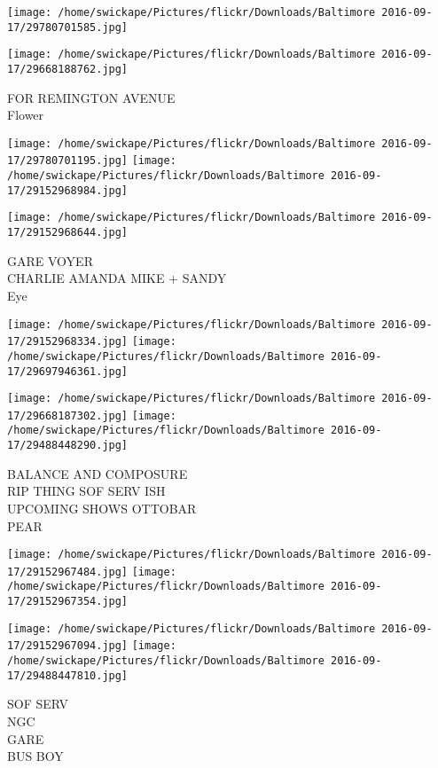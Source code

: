 \documentclass[10pt,letterpaper]{article}
\begin{document}
\texttt{[image: /home/swickape/Pictures/flickr/Downloads/Baltimore 2016-09-17/29780701585.jpg]}

\vspace{0.25in}
\texttt{[image: /home/swickape/Pictures/flickr/Downloads/Baltimore 2016-09-17/29668188762.jpg]}

FOR REMINGTON AVENUE\\
Flower\\
\pagebreak

\texttt{[image: /home/swickape/Pictures/flickr/Downloads/Baltimore 2016-09-17/29780701195.jpg]}
\texttt{[image: /home/swickape/Pictures/flickr/Downloads/Baltimore 2016-09-17/29152968984.jpg]}

\vspace{0.25in}
\texttt{[image: /home/swickape/Pictures/flickr/Downloads/Baltimore 2016-09-17/29152968644.jpg]}

GARE VOYER\\
CHARLIE AMANDA MIKE + SANDY\\
Eye\\
\pagebreak

\texttt{[image: /home/swickape/Pictures/flickr/Downloads/Baltimore 2016-09-17/29152968334.jpg]}
\texttt{[image: /home/swickape/Pictures/flickr/Downloads/Baltimore 2016-09-17/29697946361.jpg]}

\texttt{[image: /home/swickape/Pictures/flickr/Downloads/Baltimore 2016-09-17/29668187302.jpg]}
\texttt{[image: /home/swickape/Pictures/flickr/Downloads/Baltimore 2016-09-17/29488448290.jpg]}

BALANCE AND COMPOSURE\\
RIP THING SOF SERV ISH\\
UPCOMING SHOWS OTTOBAR\\
PEAR\\
\pagebreak

\texttt{[image: /home/swickape/Pictures/flickr/Downloads/Baltimore 2016-09-17/29152967484.jpg]}
\texttt{[image: /home/swickape/Pictures/flickr/Downloads/Baltimore 2016-09-17/29152967354.jpg]}

\texttt{[image: /home/swickape/Pictures/flickr/Downloads/Baltimore 2016-09-17/29152967094.jpg]}
\texttt{[image: /home/swickape/Pictures/flickr/Downloads/Baltimore 2016-09-17/29488447810.jpg]}

SOF SERV\\
NGC\\
GARE\\
BUS BOY\\
\pagebreak
\end{document}
